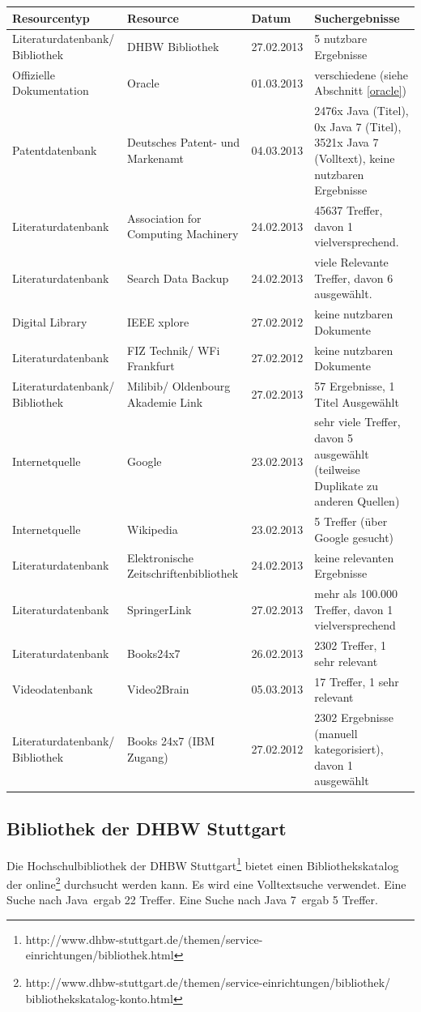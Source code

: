 \renewcommand{\arraystretch}{1.5}
\begin{longtable}{p{3.6cm}|p{3.5cm}|l|p{3.5cm}}
Resourcentyp & Resource & Datum & Suchergebnisse\\\hline\endhead
\endfoot\endlastfoot
Literaturdatenbank/ Bibliothek & DHBW Bibliothek & 27.02.2013 & 5 nutzbare Ergebnisse\\
Offizielle Dokumentation & Oracle & 01.03.2013 & verschiedene (siehe Abschnitt \ref{oracle})\\
Patentdatenbank & Deutsches Patent- und Markenamt & 04.03.2013 & 2476x Java (Titel), 0x Java 7 (Titel), 3521x Java 7 (Volltext), keine nutzbaren Ergebnisse\\
Literaturdatenbank & Association for Computing Machinery & 24.02.2013 & 45637 Treffer, davon 1 vielversprechend.\\
Literaturdatenbank & Search Data Backup & 24.02.2013 & viele Relevante Treffer, davon 6 ausgewählt.\\
Digital Library & IEEE xplore & 27.02.2012 & keine nutzbaren Dokumente\\
Literaturdatenbank & FIZ Technik/ WFi Frankfurt & 27.02.2012 & keine nutzbaren Dokumente\\
Literaturdatenbank/ Bibliothek & Milibib/ Oldenbourg Akademie Link & 27.02.2013 & 57 Ergebnisse, 1 Titel Ausgewählt\\
Internetquelle & Google & 23.02.2013 & sehr viele Treffer, davon 5 ausgewählt (teilweise Duplikate zu anderen Quellen)\\
Internetquelle & Wikipedia & 23.02.2013 & 5 Treffer (über Google gesucht)\\
Literaturdatenbank & Elektronische Zeitschriftenbibliothek & 24.02.2013 & keine relevanten Ergebnisse\\
Literaturdatenbank & SpringerLink & 27.02.2013 & mehr als 100.000 Treffer, davon 1 vielversprechend\\
Literaturdatenbank & Books24x7 & 26.02.2013 & 2302 Treffer, 1 sehr relevant\\
Videodatenbank & Video2Brain & 05.03.2013 & 17 Treffer, 1 sehr relevant\\
Literaturdatenbank/ Bibliothek & Books 24x7 (IBM Zugang) & 27.02.2012 & 2302 Ergebnisse (manuell kategorisiert), davon 1 ausgewählt\\
\end{longtable}
\renewcommand{\arraystretch}{1}

\label{startdetails}
\subsection{Bibliothek der DHBW Stuttgart}
Die Hochschulbibliothek der DHBW Stuttgart\footnote{http://www.dhbw-stuttgart.de/themen/service-einrichtungen/bibliothek.html} bietet einen Bibliothekskatalog der online\footnote{http://www.dhbw-stuttgart.de/themen/service-einrichtungen/bibliothek/\\bibliothekskatalog-konto.html} durchsucht werden kann. Es wird eine Volltextsuche verwendet. Eine Suche nach \glqq Java\grqq ~ergab 22 Treffer. Eine Suche nach \glqq Java 7\grqq ~ergab 5 Treffer.

